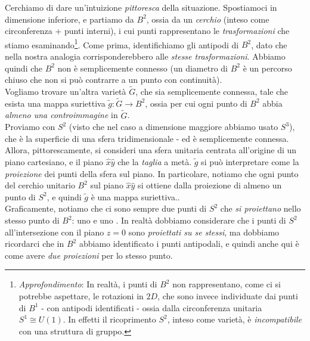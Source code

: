\documentclass[../../FisicaTeorica.tex]{subfiles}
\begin{document}
Cerchiamo di dare un'intuizione \textit{pittoresca} della situazione. Spostiamoci in dimensione inferiore, e partiamo da $B^2$, ossia da un \textit{cerchio} (inteso come circonferenza + punti interni), i cui punti rappresentano le \textit{trasformazioni} che stiamo esaminando\footnote{\textit{Approfondimento}: In realtà, i punti di $B^2$ non rappresentano, come ci si potrebbe aspettare, le rotazioni in $2D$, che sono invece individuate dai punti di $B^1$ - con antipodi identificati - ossia dalla circonferenza unitaria $S^1 \cong U(1)$. In effetti il ricoprimento $S^2$, inteso come varietà, è \textit{incompatibile} con una struttura di gruppo.}.
Come prima, identifichiamo gli antipodi di $B^2$, dato che nella nostra analogia corrisponderebbero alle \textit{stesse trasformazioni}. Abbiamo quindi che $B^2$ non è semplicemente connesso (un diametro di $B^2$ è un percorso chiuso che non si può contrarre a un punto con continuità).\\
Vogliamo trovare un'altra varietà $\tilde{G}$, che sia semplicemente connessa, tale che esista una mappa suriettiva $\tilde{g}:\tilde{G}\to B^2$, ossia per cui ogni punto di $B^2$ abbia \textit{almeno una controimmagine} in $\tilde{G}$.\\
Proviamo con $S^2$ (visto che nel caso a dimensione maggiore abbiamo usato $S^3$), che è la superficie di una sfera tridimensionale - ed è semplicemente connessa.\\
Allora, pittorescamente, si consideri una sfera unitaria centrata all'origine di un piano cartesiano, e il piano $\hat{x}\hat{y}$ che la \textit{taglia} a metà. $\tilde{g}$ si può interpretare come la \textit{proiezione} dei punti della sfera sul piano. In particolare, notiamo che ogni punto del cerchio unitario $B^2$ sul piano $\hat{x}\hat{y}$ si ottiene dalla proiezione di almeno un punto di $S^2$, e quindi $\tilde{g}$ è una mappa suriettiva..\\
Graficamente, notiamo che ci sono sempre due punti di $S^2$ che \textit{si proiettano} nello stesso punto di $B^2$: uno  e uno . In realtà dobbiamo considerare che i punti di $S^2$ all'intersezione con il piano $z=0$ sono \textit{proiettati su se stessi}, ma dobbiamo ricordarci che in $B^2$ abbiamo identificato i punti antipodali, e quindi anche qui è come avere \textit{due proiezioni} per lo stesso punto.
\end{document}

